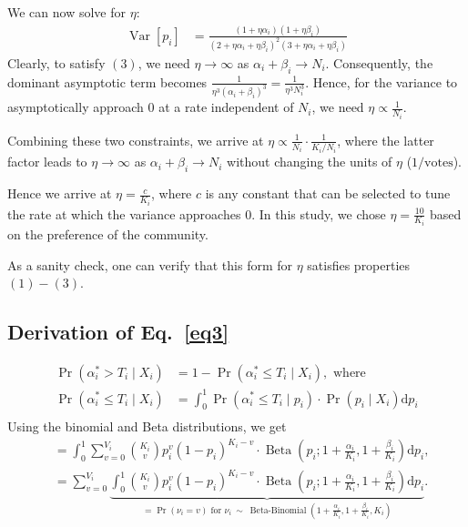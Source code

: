 \documentclass[format=acmsmall, review=true, screen=true, anonymous=true]{acmart}
\begin{document}
We can now solve for $\eta$:
\begin{align*}
\operatorname{Var}[p_i] &= \frac{(1+\eta\alpha_i)(1+\eta\beta_i)}{(2+\eta\alpha_i+\eta\beta_i)^2(3+\eta\alpha_i+\eta\beta_i)}
\end{align*}
Clearly, to satisfy $(3)$, we need $\eta \rightarrow \infty$ as $\alpha_i + \beta_i \rightarrow N_i$.  Consequently, the dominant asymptotic term becomes $\frac{1}{\eta^3 (\alpha_i + \beta_i)^3} = \frac{1}{\eta^3 N_i^3}$.  Hence, for the variance to asymptotically approach $0$ at a rate independent of $N_i$, we need $\eta \propto \frac{1}{N_i}$.

Combining these two constraints, we arrive at $\eta \propto \frac{1}{N_i}\cdot \frac{1}{K_i/N_i}$, where the latter factor leads to $\eta \rightarrow \infty$ as $\alpha_i + \beta_i \rightarrow N_i$ without changing the units of $\eta$ ($1/\text{votes}$).

Hence we arrive at $\eta = \frac{c}{K_i}$, where $c$ is any constant that can be selected to tune the rate at which the variance approaches $0$.  In this study, we chose $\eta = \frac{10}{K_i}$ based on the preference of the community.

As a sanity check, one can verify that this form for $\eta$ satisfies properties $(1)-(3)$.

\subsection{Derivation of Eq.~\eqref{eq3}}
\begin{align*}
\Pr(\alpha^*_i > T_i \mid X_i) &= 1 - \Pr(\alpha^*_i \leq T_i \mid X_i), \text{ where}\\
\Pr(\alpha^*_i \leq T_i \mid X_i) &= \int_0^1 \Pr(\alpha^*_i \leq T_i \mid p_i)\cdot \Pr(p_i \mid X_i) \mathrm{d}p_i\\
\end{align*}
Using the binomial and Beta distributions, we get
\begin{align*}
&= \int_0^1 \sum\limits_{v=0}^{V_i} {K_i \choose v} p_i^{v} {(1-p_i)}^{K_i-v} \cdot \operatorname{Beta}(p_i; 1+\frac{\alpha_i}{K_i},1+\frac{\beta_i}{K_i}) \mathrm{d}p_i,\\
&= \sum\limits_{v=0}^{V_i} \underbrace{\int_0^1 {K_i \choose v} p_i^{v} {(1-p_i)}^{K_i-v} \cdot \operatorname{Beta}(p_i; 1+\frac{\alpha_i}{K_i},1+\frac{\beta_i}{K_i}) \mathrm{d}p_i}_{= \Pr(\nu_i = v)\text{ for } \nu_i\ \sim\ \operatorname{Beta-Binomial}(1+\frac{\alpha_i}{K_i},1+\frac{\beta_i}{K_i}, K_i)}.
\end{align*}
\end{document}
